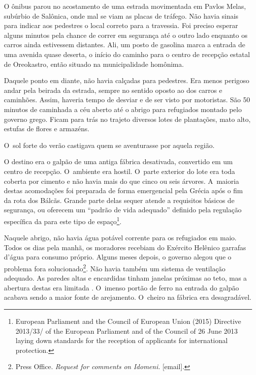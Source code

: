 \putodd{}
\clearpage

 

O ônibus parou no acostamento de uma estrada movimentada em Pavlos
Melas, subúrbio de Salônica, onde mal se viam as placas de tráfego. Não
havia sinais para indicar aos pedestres o local correto para a travessia.
Foi preciso esperar alguns minutos pela chance de correr em segurança até o
outro lado enquanto os carros ainda estivessem distantes.
Ali, um posto de gasolina marca a entrada de uma avenida quase deserta,
o início do caminho para o centro de recepção estatal de Oreokastro,
então situado na municipalidade homônima.

Daquele ponto em diante, não havia calçadas para pedestres. Era menos perigoso 
andar pela beirada da estrada, sempre no sentido oposto ao dos
carros e caminhões. Assim, haveria tempo de desviar e de ser visto por
motoristas. São 50 minutos de caminhada a céu aberto até o abrigo para
refugiados montado pelo governo grego. Ficam para trás no trajeto
diversos lotes de plantações, mato alto, estufas de flores e armazéns. 

O~sol forte do verão castigava quem se aventurasse por aquela região.

O destino era o galpão de uma antiga fábrica desativada, convertido em um
centro de recepção. O~ambiente era hostil. O~parte exterior do lote era toda
coberta por cimento e não havia mais do que cinco ou seis árvores. A~maioria
destas acomodações foi preparada de forma emergencial pela Grécia após o
fim da rota dos Bálcãs. Grande parte delas sequer atende a requisitos
básicos de segurança, ou oferecem um ``padrão de vida adequado''
definido pela regulação específica da  para este tipo de
espaço\footnote{ European Parliament and the Council of European
Union (2015) Directive 2013/33/ of the European Parliament and of the
Council of 26 June 2013 laying down standards for the reception of
applicants for international protection.}.

Naquele abrigo, não havia água potável corrente para os refugiados em
maio. Todos os dias pela manhã, os moradores recebiam do Exército
Helênico garrafas d'água para consumo próprio. Alguns meses depois, o governo alegou que o
problema fora solucionado\footnote{ Press Office. \emph{Request for comments on
Idomeni}\emph{.} {[}email{]}.}. Não havia
também um sistema de ventilação adequado. As paredes altas e encardidas
tinham janelas próximas ao teto, mas a abertura destas era limitada . O~imenso portão de
ferro na entrada do galpão acabava sendo a maior fonte de arejamento. O~cheiro na fábrica era desagradável.

